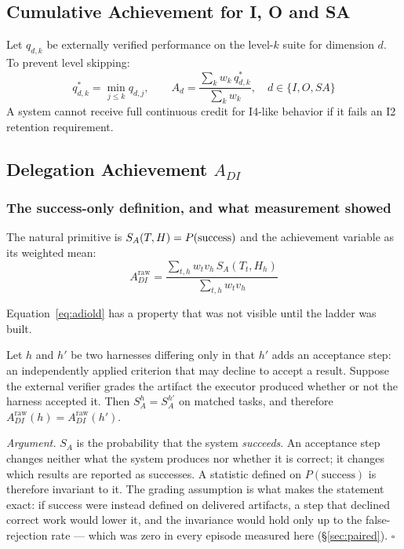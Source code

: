 \subsection{Cumulative Achievement for I, O and SA}

Let $q_{d,k}$ be externally verified performance on the level-$k$ suite for dimension $d$. To prevent level skipping:
\begin{equation}
q^{*}_{d,k} = \min_{j \le k} q_{d,j}, \qquad
A_d = \frac{\sum_k w_k\, q^{*}_{d,k}}{\sum_k w_k}, \quad d \in \{I,O,SA\}
\end{equation}
A system cannot receive full continuous credit for I4-like behavior if it fails an I2 retention requirement.

\subsection{Delegation Achievement \texorpdfstring{$A_{DI}$}{A-DI}}\label{sec:adi}

\subsubsection{The success-only definition, and what measurement showed}

The natural primitive is $S_A(T,H){} = P(\text{success})$ and the achievement variable as its weighted mean:
\begin{equation}
A_{DI}^{\mathrm{raw}} = \frac{\sum_{t,h} w_t v_h\, S_A(T_t,H_h)}{\sum_{t,h} w_t v_h}
\label{eq:adiold}
\end{equation}

Equation~\eqref{eq:adiold} has a property that was not visible until the ladder was built.

\begin{proposition}\label{prop:blind}
Let $h$ and $h'$ be two harnesses differing only in that $h'$ adds an acceptance step: an independently applied criterion that may decline to accept a result. Suppose the external verifier grades the artifact the executor produced whether or not the harness accepted it. Then $S_A^{h} = S_A^{h'}$ on matched tasks, and therefore $A_{DI}^{\mathrm{raw}}(h) = A_{DI}^{\mathrm{raw}}(h')$.
\end{proposition}

\emph{Argument.} $S_A$ is the probability that the system \emph{succeeds}. An acceptance step changes neither what the system produces nor whether it is correct; it changes which results are reported as successes. A statistic defined on $P(\text{success})$ is therefore invariant to it. The grading assumption is what makes the statement exact: if success were instead defined on delivered artifacts, a step that declined correct work would lower it, and the invariance would hold only up to the false-rejection rate --- which was zero in every episode measured here (\S\ref{sec:paired}). \hfill$\square$

